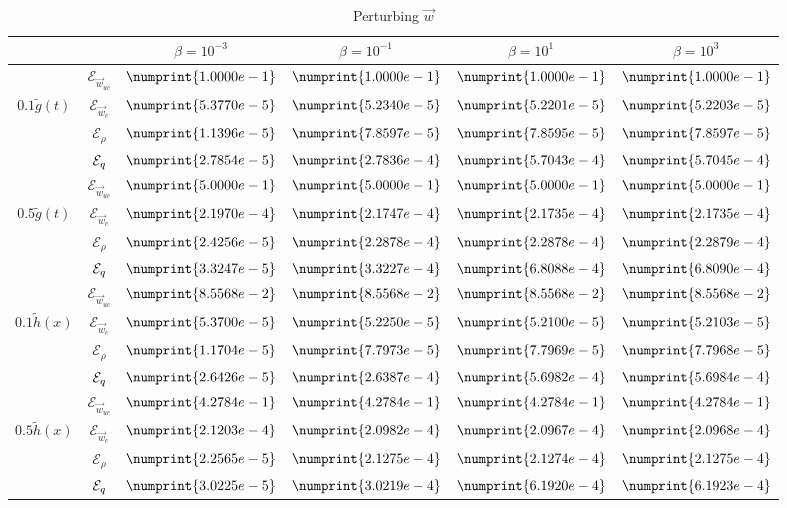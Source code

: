 \begin{table}
\begin{tabular}{ || c | c | c | c | c | c ||}
\hline
 & & $\beta = 10^{-3}$ & $\beta = 10^{-1}$ & $\beta = 10^{1}$ & $\beta = 10^{3}$  \\
\hline
 & $\mathcal{E}_{\vec{w}_{uc}}$ & $\numprint{1.0000e-1}$ & $\numprint{1.0000e-1}$ & $\numprint{1.0000e-1}$ & $\numprint{1.0000e-1}$ \\
$0.1 \tilde g(t)$ & $\mathcal{E}_{\vec{w}_c}$ & $\numprint{5.3770e-5}$ & $\numprint{5.2340e-5}$ & $\numprint{5.2201e-5}$ & $\numprint{5.2203e-5}$ \\
 & $\mathcal{E}_{\rho}$ & $\numprint{1.1396e-5}$ & $\numprint{7.8597e-5}$ & $\numprint{7.8595e-5}$ & $\numprint{7.8597e-5}$ \\
 & $\mathcal{E}_{q}$ & $\numprint{2.7854e-5}$ & $\numprint{2.7836e-4}$ & $\numprint{5.7043e-4}$ & $\numprint{5.7045e-4}$ \\
\hline
 & $\mathcal{E}_{\vec{w}_{uc}}$ & $\numprint{5.0000e-1}$ & $\numprint{5.0000e-1}$ & $\numprint{5.0000e-1}$ & $\numprint{5.0000e-1}$ \\
$0.5 \tilde g(t)$ & $\mathcal{E}_{\vec{w}_c}$ & $\numprint{2.1970e-4}$ & $\numprint{2.1747e-4}$ & $\numprint{2.1735e-4}$ & $\numprint{2.1735e-4}$ \\
 & $\mathcal{E}_{\rho}$ & $\numprint{2.4256e-5}$ & $\numprint{2.2878e-4}$ & $\numprint{2.2878e-4}$ & $\numprint{2.2879e-4}$ \\
 & $\mathcal{E}_{q}$ & $\numprint{3.3247e-5}$ & $\numprint{3.3227e-4}$ & $\numprint{6.8088e-4}$ & $\numprint{6.8090e-4}$ \\
\hline
 & $\mathcal{E}_{\vec{w}_{uc}}$ & $\numprint{8.5568e-2}$ & $\numprint{8.5568e-2}$ & $\numprint{8.5568e-2}$ & $\numprint{8.5568e-2}$ \\
$0.1 \tilde h(x)$ & $\mathcal{E}_{\vec{w}_c}$ & $\numprint{5.3700e-5}$ & $\numprint{5.2250e-5}$ & $\numprint{5.2100e-5}$ & $\numprint{5.2103e-5}$ \\
 & $\mathcal{E}_{\rho}$ & $\numprint{1.1704e-5}$ & $\numprint{7.7973e-5}$ & $\numprint{7.7969e-5}$ & $\numprint{7.7968e-5}$ \\
 & $\mathcal{E}_{q}$ & $\numprint{2.6426e-5}$ & $\numprint{2.6387e-4}$ & $\numprint{5.6982e-4}$ & $\numprint{5.6984e-4}$ \\
\hline
 & $\mathcal{E}_{\vec{w}_{uc}}$ & $\numprint{4.2784e-1}$ & $\numprint{4.2784e-1}$ & $\numprint{4.2784e-1}$ & $\numprint{4.2784e-1}$ \\
$0.5 \tilde h(x)$ & $\mathcal{E}_{\vec{w}_c}$ & $\numprint{2.1203e-4}$ & $\numprint{2.0982e-4}$ & $\numprint{2.0967e-4}$ & $\numprint{2.0968e-4}$ \\
 & $\mathcal{E}_{\rho}$ & $\numprint{2.2565e-5}$ & $\numprint{2.1275e-4}$ & $\numprint{2.1274e-4}$ & $\numprint{2.1275e-4}$ \\
 & $\mathcal{E}_{q}$ & $\numprint{3.0225e-5}$ & $\numprint{3.0219e-4}$ & $\numprint{6.1920e-4}$ & $\numprint{6.1923e-4}$ \\
\hline
\end{tabular}
\caption{Perturbing $\vec{w}$}
\label{TabA2:Prob1}
\end{table}